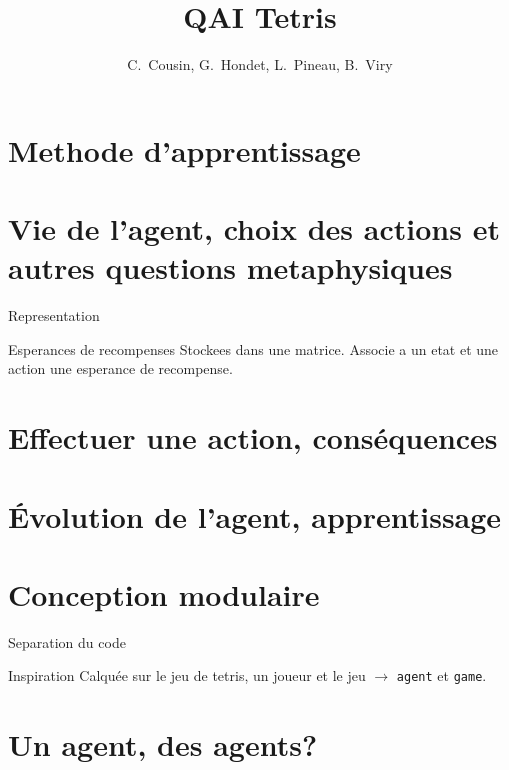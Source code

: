 \documentclass[tikz, footheight=2em]{beamer}
\title{QAI Tetris}
\author{C.~Cousin, G.~Hondet, L.~Pineau, B.~Viry}
\date{}
\begin{document}
\frame{\titlepage}


\section{Methode d'apprentissage}

\section{Vie de l'agent, choix des actions et autres questions metaphysiques}
\begin{frame}[t]{Representation}
  \begin{block}
    {Esperances de recompenses}
    Stockees dans une matrice. Associe a un etat et une action une esperance de
    recompense.
  \end{block}
\end{frame}

\section{Effectuer une action, conséquences}

\section{Évolution de l'agent, apprentissage}

\section{Conception modulaire}
\begin{frame}[t]{Separation du code}
  \begin{block}{Inspiration}
    Calquée sur le jeu de tetris, un joueur et le jeu \(\rightarrow\)
    \texttt{agent} et \texttt{game}.
  \end{block}
\end{frame}

\section{Un agent, des agents?}
\end{document}
